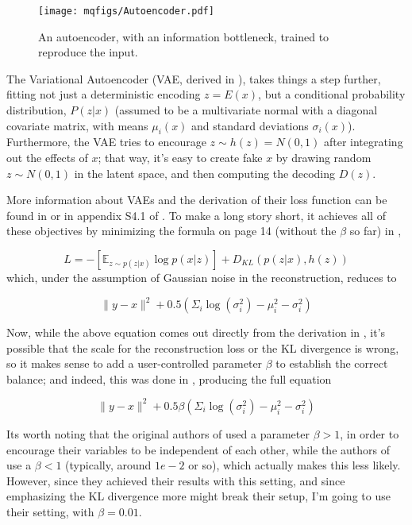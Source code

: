 \documentclass[aps,prl,preprint,groupedaddress]{revtex4-1}
\begin{document}
\begin{figure}[h]
   \centering
   \texttt{[image: mqfigs/Autoencoder.pdf]}
   \caption{\label{autoencoder} An autoencoder, with an information bottleneck, trained to reproduce the input.}
\end{figure}

The Variational Autoencoder (VAE, derived in \cite{VAE}), takes things a step further, 
fitting not just a deterministic encoding $z = E(x)$, but a conditional probability distribution, $P(z | x)$ (assumed to be a multivariate normal with a diagonal covariate matrix, with means $\mu_i(x)$ and standard deviations $\sigma_i(x)$). 
Furthermore, the VAE tries to encourage $z \sim h(z) = N(0, 1)$ after integrating out the effects of $x$; that way, it's easy to create fake $x$ by drawing random $z \sim N(0, 1)$ in the latent space, and then computing the decoding $D(z)$.

More information about VAEs and the derivation of their loss function can be found in \cite{VAE} or in appendix S4.1 of \cite{iten2020supplement}. To make a long story short, it achieves all of these objectives by minimizing the formula on page 14 (without the $\beta$ so far) in \cite{iten2020supplement}, 

$$ L = -\left[ \mathbb{E}_{z \sim p(z | x)} \log p(x | z) \right] + D_{KL}\left( p(z|x), h(z) \right) $$
which, under the assumption of Gaussian noise in the reconstruction, reduces to 

$$ \| y - x\| ^2 + 0.5\left( \Sigma_i \log(\sigma_i^2 ) - \mu_i^2 - \sigma_i^2 \right)$$

Now, while the above equation comes out directly from the derivation in \cite{VAE}, it's possible that the scale for the reconstruction loss or the KL divergence is wrong, so it makes sense to add a user-controlled parameter $\beta$ to establish the correct balance; and indeed, this was done in \cite{betaVAE}, producing the full equation

$$ \| y - x\| ^2 + 0.5\beta\left( \Sigma_i \log(\sigma_i^2 ) - \mu_i^2 - \sigma_i^2 \right)$$

Its worth noting that the original authors of \cite{betaVAE} used a parameter $\beta > 1$, in order to encourage their variables to be independent of each other, while the authors of \cite{iten2020} use a $\beta < 1$ (typically, around $1e-2$ or so), which actually makes this less likely. However, since they achieved their results with this setting, and since emphasizing the KL divergence more might break their setup, I'm going to use their setting, with $\beta = 0.01$.
\end{document}
